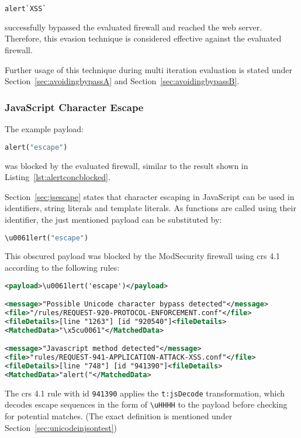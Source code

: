 \begin{lstlisting}[style=basicStyle, language=Python, caption=alert`XSS` bypass, label=lst:alertXSSbypass]
alert`XSS`
\end{lstlisting}
successfully bypassed the evaluated firewall and reached the web server. Therefore, this evasion technique is considered effective against the evaluated firewall.

Further usage of this technique during multi iteration evaluation is stated under Section~\ref{sec:avoidingbypassA} and Section~\ref{sec:avoidingbypassB}.

\subsubsection{JavaScript Character Escape}
\label{sec:jsescapesingleiter}
The example payload:

\begin{lstlisting}[style=basicStyle, language=Python]
alert("escape")
\end{lstlisting}
was blocked by the evaluated firewall, similar to the result shown in Listing~\ref{lst:alertconcblocked}.

%

Section~\ref{sec:jsescape} states that character escaping in JavaScript can be used in identifiers, string literals and template literals.
As functions are called using their identifier, the just mentioned payload can be substituted by:

\begin{lstlisting}[style=basicStyle, language=Python]
\u0061lert("escape")
\end{lstlisting}
This obscured payload was blocked by the ModSecurity firewall using \acrshort{crs} 4.1 according to the following rules:

\begin{lstlisting}[style=ruleStyle, language=XML, caption=\textbackslash u0061lert('escape') blocked]
<payload>\u0061lert('escape')</payload>

<message>"Possible Unicode character bypass detected"</message>
<file>"/rules/REQUEST-920-PROTOCOL-ENFORCEMENT.conf"</file>
<fileDetails>[line "1263"] [id "920540"]<fileDetails>
<MatchedData>"\x5cu0061"</MatchedData>

<message>"Javascript method detected"</message>
<file>"rules/REQUEST-941-APPLICATION-ATTACK-XSS.conf"</file>
<fileDetails>[line "748"] [id "941390"]<fileDetails>
<MatchedData>"alert("</MatchedData>
\end{lstlisting}
The \acrshort{crs} 4.1 rule with id \verb|941390| applies the \verb|t:jsDecode| transformation, which decodes escape sequences in the form of \verb|\uHHHH| to the payload before checking for potential matches. \cite{modsec/transjsdecode} (The exact definition is mentioned under Section~\ref{sec:unicodeinjsontest})

